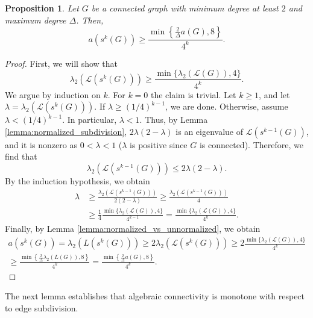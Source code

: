 \documentclass[a4paper,11pt]{article}
\theoremstyle{plain}
\newtheorem{proposition}[theorem]{\bf Proposition}
\theoremstyle{definition}
\begin{document}
\begin{proposition}\label{prop:iterated_subdivision}
Let $G$ be a connected graph with minimum degree at least $2$ and maximum degree $\Delta$. Then,
\[
a(s^k(G))\geq \frac{\min\left\{\frac{2}{\Delta}a(G),8\right\}}{4^k}.
\]
\end{proposition}
\begin{proof}
First, we will show that
\[
    \lambda_2(\mathcal{L}(s^k(G)))\geq \frac{\min\{\lambda_2(\mathcal{L}(G)),4\}}{4^k}.
\]
We argue by induction on $k$. For $k=0$ the claim is trivial. Let $k\geq 1$, and let $\lambda=\lambda_2(\mathcal{L}(s^{k}(G)))$.
If $\lambda\geq (1/4)^{k-1}$, we are done. Otherwise, assume $\lambda<(1/4)^{k-1}$. In particular, $\lambda< 1$. Thus, by Lemma \ref{lemma:normalized_subdivision}, $2\lambda (2-\lambda)$ is an eigenvalue of $\mathcal{L}(s^{k-1}(G))$,
and it is nonzero as $0<\lambda<1$ ($\lambda$ is positive since $G$ is connected).
Therefore, we find that
\[
    \lambda_2(\mathcal{L}(s^{k-1}(G))) \leq 2\lambda(2-\lambda).
\]  
By the induction hypothesis, we obtain
\begin{align*}
\lambda &\geq \frac{\lambda_2(\mathcal{L}(s^{k-1}(G)))}{2(2-\lambda)} \geq  \frac{\lambda_2(\mathcal{L}(s^{k-1}(G)))}{4} \\
&\geq \frac{1}{4}\frac{\min\{\lambda_2(\mathcal{L}(G)),4\}}{4^{k-1}}= \frac{\min\{\lambda_2(\mathcal{L}(G)),4\}}{4^k}.
\end{align*}
Finally, by Lemma \ref{lemma:normalized_vs_unnormalized}, we obtain
\begin{multline*}
a(s^k(G))=\lambda_2(L(s^k(G)))\geq 2 \lambda_2(\mathcal{L}(s^k(G))) \geq 2\frac{\min\{\lambda_2(\mathcal{L}(G)),4\}}{4^k}
\\
\geq \frac{\min\left\{\frac{2}{\Delta}\lambda_2(L(G)),8\right\}}{4^k} = \frac{\min\left\{\frac{2}{\Delta}a(G),8\right\}}{4^k}.
\end{multline*}
\end{proof}

The next lemma establishes that algebraic connectivity is monotone with respect to edge subdivision.
\end{document}
